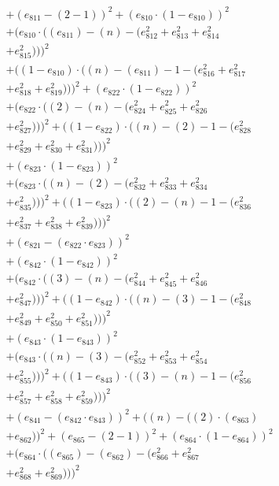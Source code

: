 \documentclass[10pt, a4paper]{article}
\begin{document}
\begin{align*}
& + (e_{811} - (2 - 1))^{2} + (e_{810}  \cdot  (1 - e_{810}))^{2} \\
& + (e_{810}  \cdot  ((e_{811}) - (n) - (e_{812}^{2} + e_{813}^{2} + e_{814}^{2} \\
& + e_{815}^{2})))^{2} \\
& + ((1 - e_{810})  \cdot  ((n) - (e_{811}) - 1 - (e_{816}^{2} + e_{817}^{2} \\
& + e_{818}^{2} + e_{819}^{2})))^{2} + (e_{822}  \cdot  (1 - e_{822}))^{2} \\
& + (e_{822}  \cdot  ((2) - (n) - (e_{824}^{2} + e_{825}^{2} + e_{826}^{2} \\
& + e_{827}^{2})))^{2} + ((1 - e_{822})  \cdot  ((n) - (2) - 1 - (e_{828}^{2} \\
& + e_{829}^{2} + e_{830}^{2} + e_{831}^{2})))^{2} \\
& + (e_{823}  \cdot  (1 - e_{823}))^{2} \\
& + (e_{823}  \cdot  ((n) - (2) - (e_{832}^{2} + e_{833}^{2} + e_{834}^{2} \\
& + e_{835}^{2})))^{2} + ((1 - e_{823})  \cdot  ((2) - (n) - 1 - (e_{836}^{2} \\
& + e_{837}^{2} + e_{838}^{2} + e_{839}^{2})))^{2} \\
& + (e_{821} - (e_{822}  \cdot  e_{823}))^{2} \\
& + (e_{842}  \cdot  (1 - e_{842}))^{2} \\
& + (e_{842}  \cdot  ((3) - (n) - (e_{844}^{2} + e_{845}^{2} + e_{846}^{2} \\
& + e_{847}^{2})))^{2} + ((1 - e_{842})  \cdot  ((n) - (3) - 1 - (e_{848}^{2} \\
& + e_{849}^{2} + e_{850}^{2} + e_{851}^{2})))^{2} \\
& + (e_{843}  \cdot  (1 - e_{843}))^{2} \\
& + (e_{843}  \cdot  ((n) - (3) - (e_{852}^{2} + e_{853}^{2} + e_{854}^{2} \\
& + e_{855}^{2})))^{2} + ((1 - e_{843})  \cdot  ((3) - (n) - 1 - (e_{856}^{2} \\
& + e_{857}^{2} + e_{858}^{2} + e_{859}^{2})))^{2} \\
& + (e_{841} - (e_{842}  \cdot  e_{843}))^{2} + ((n) - ((2)  \cdot  (e_{863}) \\
& + e_{862}))^{2} + (e_{865} - (2 - 1))^{2} + (e_{864}  \cdot  (1 - e_{864}))^{2} \\
& + (e_{864}  \cdot  ((e_{865}) - (e_{862}) - (e_{866}^{2} + e_{867}^{2} \\
& + e_{868}^{2} + e_{869}^{2})))^{2} \\

\end{align*}
\end{document}
